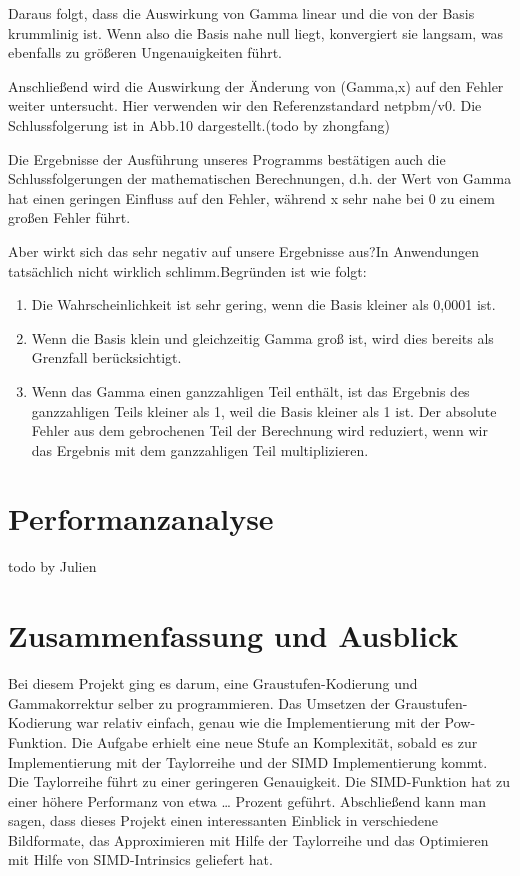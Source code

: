 \documentclass[course=erap]{aspdoc}
\begin{document}
    
\par
Daraus folgt, dass die Auswirkung von Gamma linear und die von der Basis krummlinig ist. Wenn also die Basis nahe null liegt, konvergiert sie langsam, was ebenfalls zu größeren Ungenauigkeiten führt.

\par
Anschließend wird die Auswirkung der Änderung von (Gamma,x) auf den Fehler weiter untersucht. Hier verwenden wir den Referenzstandard netpbm/v0. Die Schlussfolgerung ist in Abb.10 dargestellt.(todo by zhongfang)

\par
Die Ergebnisse der Ausführung unseres Programms bestätigen auch die Schlussfolgerungen der mathematischen Berechnungen, d.h. der Wert von Gamma hat einen geringen Einfluss auf den Fehler, während x sehr nahe bei 0 zu einem großen Fehler führt.

\par
Aber wirkt sich das sehr negativ auf unsere Ergebnisse aus?In Anwendungen tatsächlich nicht wirklich schlimm.Begründen ist wie folgt:
\begin{enumerate}
\item Die Wahrscheinlichkeit ist sehr gering, wenn die Basis kleiner als 0,0001 ist.
\item Wenn die Basis klein und gleichzeitig Gamma groß ist, wird dies bereits als Grenzfall berücksichtigt.
\item Wenn das Gamma einen ganzzahligen Teil enthält, ist das Ergebnis des ganzzahligen Teils kleiner als 1, weil die Basis kleiner als 1 ist. Der absolute Fehler aus dem gebrochenen Teil der Berechnung wird reduziert, wenn wir das Ergebnis mit dem ganzzahligen Teil multiplizieren.
\end{enumerate}

\section{Performanzanalyse}

\par
todo by Julien


\section{Zusammenfassung und Ausblick}

\par
Bei diesem Projekt ging es darum, eine Graustufen-Kodierung und Gammakorrektur selber zu programmieren. Das Umsetzen der Graustufen-Kodierung war relativ einfach, genau wie die Implementierung mit der Pow-Funktion. Die Aufgabe erhielt eine neue Stufe an Komplexität, sobald es zur Implementierung mit der Taylorreihe und der SIMD Implementierung kommt. Die Taylorreihe führt zu einer geringeren Genauigkeit. Die SIMD-Funktion hat zu einer höhere Performanz von etwa … Prozent geführt. Abschließend kann man sagen, dass dieses Projekt einen interessanten Einblick in verschiedene Bildformate, das Approximieren mit Hilfe der Taylorreihe und das Optimieren mit Hilfe von SIMD-Intrinsics geliefert hat.
\end{document}
